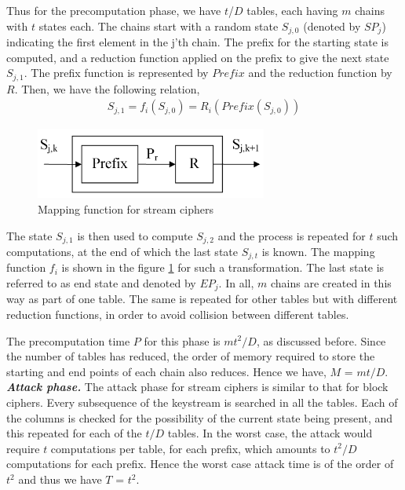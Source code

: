 Thus for the precomputation phase, we have $t$/$D$ tables, each having $m$ chains with $t$ states each. The chains start with a random state $S_{j,0}$ (denoted by $SP_j$) indicating the first element in the j'th chain. The prefix for the starting state is computed, and a reduction function applied on the prefix to give the next state $S_{j,1}$. The prefix function is represented by $Prefix$ and the reduction function by $R$. Then, we have the following relation,
\begin{align*}
S_{j,1} = f_i(S_{j,0}) = R_i(Prefix(S_{j,0}))
\end{align*}  
\begin{figure}[ht!]
	\centering
		\includegraphics[width=3in]{./figures/mapping-function-stream.PNG}
	\caption{Mapping function for stream ciphers}	
	\label{fig:mapping-function-stream}
\end{figure}

The state $S_{j,1}$ is then used to compute $S_{j,2}$ and the process is repeated for $t$ such computations, at the end of which the last state $S_{j,t}$ is known. The mapping function $f_i$ is shown in the figure \ref{fig:mapping-function-stream} for such a transformation. The last state is referred to as end state and denoted by $EP_j$. In all, $m$ chains are created in this way as part of one table. The same is repeated for other tables but with different reduction functions, in order to avoid collision between different tables. 

The precomputation time $P$ for this phase is $mt^2/D$, as discussed before. Since the number of tables has reduced, the order of memory required to store the starting and end points of each chain also reduces. Hence we have, $M$ = $mt/D$.\\

\noindent \textit{\textbf{Attack phase.}} The attack phase for stream ciphers is similar to that for block ciphers. Every subsequence of the keystream is searched in all the tables. Each of the columns is checked for the possibility of the current state being present, and this repeated for each of the $t/D$ tables. In the worst case, the attack would require $t$ computations per table, for each prefix, which amounts to $t^2/D$ computations for each prefix. Hence the worst case attack time is of the order of $t^2$ and thus we have $T$ = $t^2$.\\

